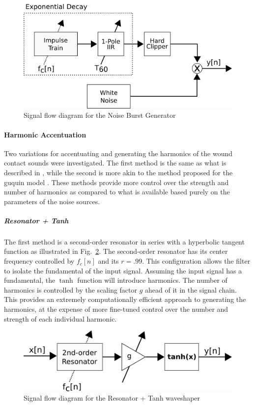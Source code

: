 \documentclass[../main.tex]{subfiles}
\begin{document}
\begin{figure}[h]
    \centering
    \includegraphics[scale=.5]{./images/diagrams/NoiseBurstGen.png}
    \caption{Signal flow diagram for the Noise Burst Generator}
    \label{fig:NoiseBurstGen}
\end{figure}

\paragraph{Harmonic Accentuation}
Two variations for accentuating and generating the harmonics of the wound contact sounds were investigated. The first method is the same as what is described in , while the second is more akin to the method proposed for the guquin model . These methods provide more control over the strength and number of harmonics as compared to what is available based purely on the parameters of the noise sources.

\subparagraph{Resonator + Tanh}
The first method is a second-order resonator in series with a hyperbolic tangent function as illustrated in Fig.~\ref{fig:ResoTanh}. The second-order resonator has its center frequency controlled by $f_c[n]$ and its $r = .99$. This configuration allows the filter to isolate the fundamental of the input signal. Assuming the input signal has a fundamental, the $\tanh$ function will introduce harmonics. The number of harmonics is controlled by the scaling factor $g$ ahead of it in the signal chain. This provides an extremely computationally efficient approach to generating the harmonics, at the expense of more fine-tuned control over the number and strength of each individual harmonic.

\begin{figure}[h]
    \centering
    \includegraphics[scale=.5]{./images/diagrams/ResoTanh.png}
    \caption{Signal flow diagram for the Resonator + Tanh waveshaper}
    \label{fig:ResoTanh}
\end{figure}
\end{document}
